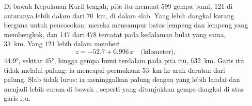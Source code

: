 Di bawah Kepulauan Kuril tengah, pita itu memuat 599 gempa bumi, 121 di antaranya lebih dalam dari \qty{70}{km}, di dalam slab. Yang lebih dangkal kurang berguna untuk pencocokan: mereka mencampur batas lempeng dan lempeng yang membengkok, dan 147 dari 478 tercatat pada kedalaman bulat yang sama, \qty{33}{km}. Yang 121 lebih dalam memberi
\[
  z = -52.7 + 0.996\,x \quad\text{(kilometer)},
\]
 \ang{44.9}, sekitar \ang{45}, hingga gempa bumi terdalam pada pita itu, \qty{632}{km}. Garis itu tidak melalui palung: ia mencapai
permukaan \qty{53}{km} ke arah daratan dari palung. Slab tidak lurus: ia meninggalkan palung dengan  yang lebih landai dan menjadi lebih curam di bawah , seperti yang ditunjukkan gempa dangkal di atas garis itu.


